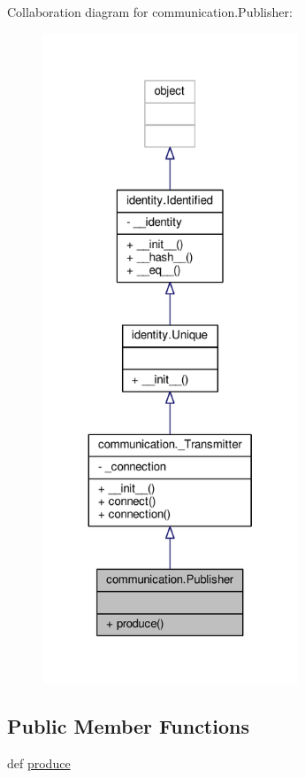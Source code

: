 Collaboration diagram for communication.\+Publisher\+:\nopagebreak
\begin{figure}[H]
\begin{center}
\leavevmode
\includegraphics[height=550pt]{classcommunication_1_1Publisher__coll__graph}
\end{center}
\end{figure}
\subsection*{Public Member Functions}
\begin{DoxyCompactItemize}
\item 
def \hyperlink{classcommunication_1_1Publisher_ac345fa66174cd778013cfcc2c101a047}{produce}
\end{DoxyCompactItemize}


